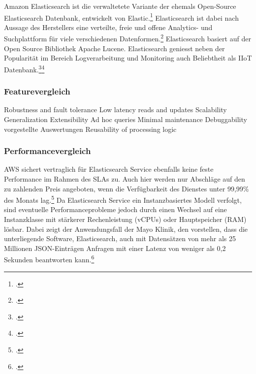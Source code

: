 Amazon Elasticsearch ist die verwaltetete Variante der ehemals Open-Source Elasticsearch Datenbank, entwickelt von Elastic.\footcite[Vgl.][]{Barr.01.10.2015} Elasticsearch ist dabei nach Aussage des Herstellers eine verteilte, freie und offene Analytics- und Suchplattform für viele verschiedenen Datenformen.\footcite[Vgl.][]{ElasticsearchInc..o.J.} Elasticsearch basiert auf der Open Source Bibliothek Apache Lucene. Elasticsearch geniesst neben der Popularität im Bereich Logverarbeitung und Monitoring auch Beliebtheit als \ac{IIoT} Datenbank.\footcite[Vgl.][]{Mantfeld.2019}\nzitat\footcite[Vgl.][]{Bajer.2017}

\subsubsection{Featurevergleich}
Robustness and fault tolerance
Low latency reads and updates
Scalability
Generalization
Extensibility
Ad hoc queries
Minimal maintenance
Debuggability
vorgestellte Auswertungen 
Reusability of processing logic

\subsubsection{Performancevergleich}
\ac{AWS} sichert vertraglich für Elasticsearch Service ebenfalls keine feste Performance im Rahmen des \acp{SLA} zu. Auch hier werden nur Abschläge auf den zu zahlenden Preis angeboten, wenn die Verfügbarkeit des Dienstes unter 99,99\% des Monats lag.\footcite[Vgl.][]{AmazonWebServicesInc..2019} Da Elasticsearch Service ein Instanzbasiertes Modell verfolgt, sind eventuelle Performanceprobleme jedoch durch einen Wechsel auf eine Instanzklasse mit stärkerer Rechenleistung (vCPUs) oder Hauptspeicher (\ac{RAM}) lösbar. Dabei zeigt der Anwendungsfall der Mayo Klinik, den \citeauthor{Chen.2017} vorstellen, dass die unterliegende Software, Elasticsearch, auch mit Datensätzen von mehr als 25 Millionen \ac{JSON}-Einträgen Anfragen mit einer Latenz von weniger als 0,2 Sekunden beantworten kann.\footcite[Vgl.][]{Chen.2017}

